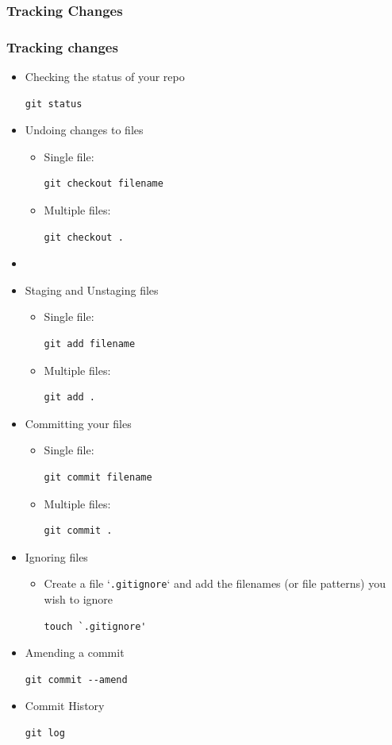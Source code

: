 \documentclass[10pt,t,sans,mathsans,xcolor=dvipsnames]{beamer}
\begin{document}
\subsubsection*{Tracking Changes}
\begin{frame}
\frametitle{Tracking changes}
\begin{itemize}
\item Checking the status of your repo
\begin{lstlisting}
git status
\end{lstlisting}
\item Undoing changes to files
\begin{itemize}
\item Single file:
\begin{lstlisting}
git checkout filename
\end{lstlisting}
\item Multiple files:
\begin{lstlisting}
git checkout .
\end{lstlisting}
\end{itemize}
\item[]
\item Staging and Unstaging files
\begin{itemize}
\item Single file:
\begin{lstlisting}
git add filename
\end{lstlisting}
\item Multiple files:
\begin{lstlisting}
git add .
\end{lstlisting}
\end{itemize}
\item Committing your files
\begin{itemize}
\item Single file:
\begin{lstlisting}
git commit filename
\end{lstlisting}
\item Multiple files:
\begin{lstlisting}
git commit .
\end{lstlisting}
\end{itemize}
\item Ignoring files
\begin{itemize}
\item Create a file `\texttt{.gitignore}` and add the filenames (or file patterns) you wish to ignore
\begin{lstlisting}
touch `.gitignore'
\end{lstlisting}
\end{itemize}
\item Amending a commit
\begin{lstlisting}
git commit --amend
\end{lstlisting}
\item Commit History
\begin{lstlisting}
git log
\end{lstlisting}
\end{itemize}
\end{frame}
\end{document}
